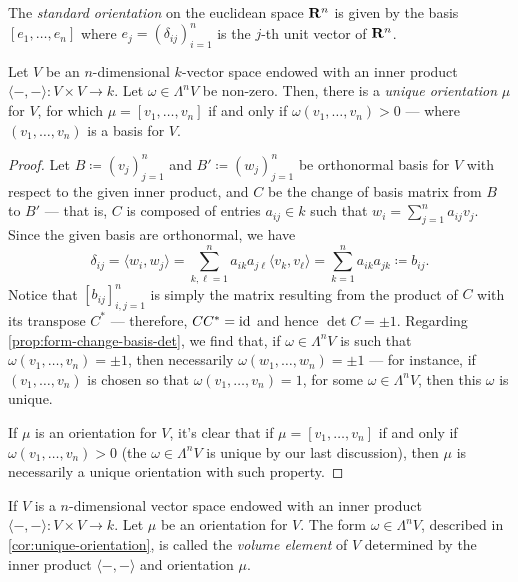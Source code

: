 \begin{definition}
\label{def:standard-orientation-euclidean}
The \emph{standard orientation} on the euclidean space \(\mathbf{R}^n\) is given by the
basis \([e_1, \dots, e_n]\) where \(e_j = (\delta_{ij})_{i=1}^n\) is the
\(j\)-th unit vector of \(\mathbf{R}^n\).
\end{definition}

\begin{corollary}\label{cor:unique-orientation}
Let \(V\) be an \(n\)-dimensional \(k\)-vector space endowed with an inner
product \(\langle -, - \rangle: V \times V \to k\). Let \(\omega \in \Lambda^n
V\) be non-zero. Then, there is a \emph{unique orientation} \(\mu\) for \(V\),
for which \(\mu = [v_1, \dots, v_n]\) if and only if \(\omega(v_1, \dots, v_n) >
0\) --- where \((v_1, \dots, v_n)\) is a basis for \(V\).
\end{corollary}

\begin{proof}
Let \(B \coloneq (v_j)_{j=1}^n\) and \(B' \coloneq (w_j)_{j=1}^n\) be
orthonormal basis for \(V\) with respect to the given inner product, and \(C\)
be the change of basis matrix from \(B\) to \(B'\) --- that is, \(C\) is
composed of entries \(a_{ij} \in k\) such that \(w_i = \sum_{j=1}^n a_{ij}v_j\).
Since the given basis are orthonormal, we have
\[
  \delta_{i j} = \langle w_i, w_j \rangle
  = \sum_{k, \ell = 1}^n a_{i k} a_{j \ell} \langle v_k, v_{\ell} \rangle
  = \sum_{k=1}^n a_{i k} a_{j k}
  \coloneq b_{i j}.
\]
Notice that \([b_{ij}]_{i,j=1}^n\) is simply the matrix resulting from the
product of \(C\) with its transpose \(C^{*}\) --- therefore, \(C C^{*} = \operatorname{id}\)
and hence \(\det C = \pm 1\). Regarding \cref{prop:form-change-basis-det}, we
find that, if \(\omega \in \Lambda^{n} V\) is such that \(\omega(v_1, \dots,
v_n) = \pm 1\), then necessarily \(\omega(w_1, \dots, w_n) = \pm 1\) --- for
instance, if \((v_1, \dots, v_n)\) is chosen so that \(\omega(v_1, \dots, v_n)
= 1\), for some \(\omega \in \Lambda^n V\), then this \(\omega\) is unique.

If \(\mu\) is an orientation for \(V\), it's clear that if \(\mu = [v_1, \dots,
v_n]\) if and only if \(\omega(v_1, \dots, v_n) > 0\) (the \(\omega \in
\Lambda^n V\) is unique by our last discussion), then \(\mu\) is necessarily a
unique orientation with such property.
\end{proof}

\begin{definition}
\label{def:volume-element-vector-space}
If \(V\) is a \(n\)-dimensional vector space endowed with an inner product
\(\langle -, - \rangle: V \times V \to k\). Let \(\mu\) be an orientation for
\(V\). The form \(\omega \in \Lambda^n V\), described in
\cref{cor:unique-orientation}, is called the \emph{volume element} of \(V\)
determined by the inner product \(\langle -, - \rangle\) and orientation
\(\mu\).
\end{definition}


